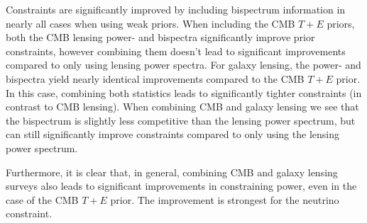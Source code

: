 \documentclass[11pt]{article} %
\begin{document}
Constraints are significantly improved by including bispectrum information in nearly all cases when using weak priors. When including the CMB $T+E$ priors, both the CMB lensing power- and bispectra significantly improve prior constraints, however combining them doesn't lead to significant improvements compared to only using lensing power spectra. For galaxy lensing, the power- and bispectra yield nearly identical improvements compared to the CMB $T+E$ prior. In this case, combining both statistics leads to significantly tighter constraints (in contrast to CMB lensing). When combining CMB and galaxy lensing we see that the bispectrum is slightly less competitive than the lensing power spectrum, but can still significantly improve constraints compared to only using the lensing power spectrum.

Furthermore, it is clear that, in general, combining CMB and galaxy lensing surveys also leads to significant improvements in constraining power, even in the case of the CMB $T+E$ prior. The improvement is strongest for the neutrino constraint.
\end{document}

